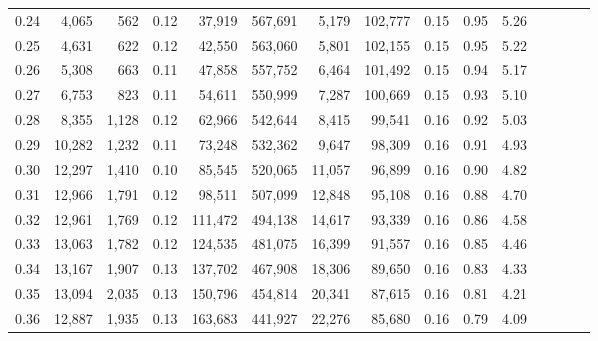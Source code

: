 \begin{tabular}{rrrcrrrrrrrrrrr}
0.24 &   4,065 &     562 &                                       0.12 &   37,919 &  567,691 &    5,179 &  102,777 &  0.15 &  0.95 &                         5.26 \\
0.25 &   4,631 &     622 &                                       0.12 &   42,550 &  563,060 &    5,801 &  102,155 &  0.15 &  0.95 &                         5.22 \\
0.26 &   5,308 &     663 &                                       0.11 &   47,858 &  557,752 &    6,464 &  101,492 &  0.15 &  0.94 &                         5.17 \\
0.27 &   6,753 &     823 &                                       0.11 &   54,611 &  550,999 &    7,287 &  100,669 &  0.15 &  0.93 &                         5.10 \\
0.28 &   8,355 &   1,128 &                                       0.12 &   62,966 &  542,644 &    8,415 &   99,541 &  0.16 &  0.92 &                         5.03 \\
0.29 &  10,282 &   1,232 &                                       0.11 &   73,248 &  532,362 &    9,647 &   98,309 &  0.16 &  0.91 &                         4.93 \\
0.30 &  12,297 &   1,410 &                                       0.10 &   85,545 &  520,065 &   11,057 &   96,899 &  0.16 &  0.90 &                         4.82 \\
0.31 &  12,966 &   1,791 &                                       0.12 &   98,511 &  507,099 &   12,848 &   95,108 &  0.16 &  0.88 &                         4.70 \\
0.32 &  12,961 &   1,769 &                                       0.12 &  111,472 &  494,138 &   14,617 &   93,339 &  0.16 &  0.86 &                         4.58 \\
0.33 &  13,063 &   1,782 &                                       0.12 &  124,535 &  481,075 &   16,399 &   91,557 &  0.16 &  0.85 &                         4.46 \\
0.34 &  13,167 &   1,907 &                                       0.13 &  137,702 &  467,908 &   18,306 &   89,650 &  0.16 &  0.83 &                         4.33 \\
0.35 &  13,094 &   2,035 &                                       0.13 &  150,796 &  454,814 &   20,341 &   87,615 &  0.16 &  0.81 &                         4.21 \\
0.36 &  12,887 &   1,935 &                                       0.13 &  163,683 &  441,927 &   22,276 &   85,680 &  0.16 &  0.79 &                         4.09 \\

\end{tabular}
